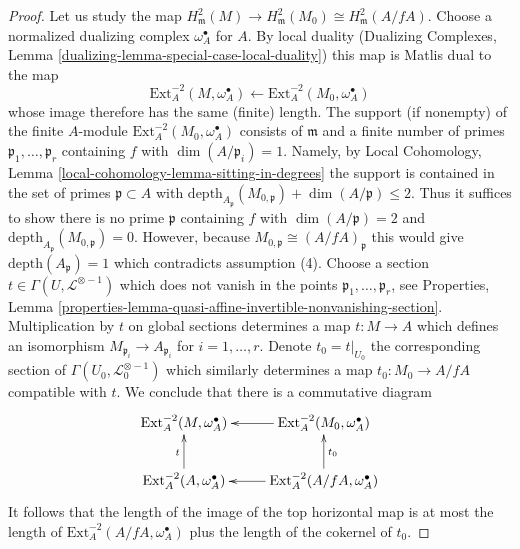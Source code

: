 \begin{proof}
\medskip\noindent
Let us study the map
$H^2_\mathfrak m(M) \to H^2_\mathfrak m(M_0) \cong H^2_\mathfrak m(A/fA)$.
Choose a normalized dualizing complex $\omega_A^\bullet$ for $A$.
By local duality
(Dualizing Complexes, Lemma \ref{dualizing-lemma-special-case-local-duality})
this map is Matlis dual to the map
$$
\text{Ext}^{-2}_A(M, \omega_A^\bullet)
\longleftarrow
\text{Ext}^{-2}_A(M_0, \omega_A^\bullet)
$$
whose image therefore has the same (finite) length.
The support (if nonempty) of the finite $A$-module
$\text{Ext}^{-2}_A(M_0, \omega_A^\bullet)$ consists of
$\mathfrak m$ and a finite number of primes
$\mathfrak p_1, \ldots, \mathfrak p_r$ containing $f$ with
$\dim(A/\mathfrak p_i) = 1$. Namely, by
Local Cohomology, Lemma \ref{local-cohomology-lemma-sitting-in-degrees}
the support is contained in the set of primes $\mathfrak p \subset A$ with
$\text{depth}_{A_\mathfrak p}(M_{0, \mathfrak p}) + \dim(A/\mathfrak p) \leq 2$.
Thus it suffices to show there is no prime $\mathfrak p$ containing $f$ with
$\dim(A/\mathfrak p) = 2$ and
$\text{depth}_{A_\mathfrak p}(M_{0, \mathfrak p}) = 0$.
However, because $M_{0, \mathfrak p} \cong (A/fA)_\mathfrak p$
this would give $\text{depth}(A_\mathfrak p) = 1$ which contradicts
assumption (4).
Choose a section $t \in \Gamma(U, \mathcal{L}^{\otimes -1})$
which does not vanish in the points $\mathfrak p_1, \ldots, \mathfrak p_r$, see
Properties, Lemma
\ref{properties-lemma-quasi-affine-invertible-nonvanishing-section}.
Multiplication by $t$ on global sections determines a map $t : M \to A$
which defines an isomorphism $M_{\mathfrak p_i} \to A_{\mathfrak p_i}$ for
$i = 1, \ldots, r$. Denote $t_0 = t|_{U_0}$ the corresponding section
of $\Gamma(U_0, \mathcal{L}_0^{\otimes -1})$ which similarly determines
a map $t_0 : M_0 \to A/fA$ compatible with $t$.
We conclude that there is a commutative diagram
$$
\xymatrix{
\text{Ext}^{-2}_A(M, \omega_A^\bullet) &
\text{Ext}^{-2}_A(M_0, \omega_A^\bullet) \ar[l] \\
\text{Ext}^{-2}_A(A, \omega_A^\bullet) \ar[u]^t &
\text{Ext}^{-2}_A(A/fA, \omega_A^\bullet) \ar[l] \ar[u]_{t_0}
}
$$
It follows that the length of the image of the top horizontal
map is at most the length of $\text{Ext}^{-2}_A(A/fA, \omega_A^\bullet)$
plus the length of the cokernel of $t_0$.


\end{proof}
